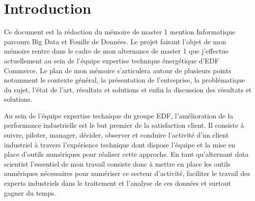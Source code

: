 \chapter*{Introduction}

Ce document est la rédaction du mémoire  de master 1 mention Informatique parcours Big Data et Fouille de Données. Le projet faisant l’objet de mon mémoire rentre dans le cadre de mon alternance de master 1 que j’effectue actuellement au sein de l’équipe expertise technique énergétique d’EDF Commerce.
Le plan de mon mémoire s’articulera autour de plusieurs points notamment le contexte général, la présentation de l’entreprise, la problématique du sujet, l’état de l’art, résultats et solutions et enfin la discussion des résultats et solutions.

Au sein de l’équipe expertise technique du groupe EDF, l’amélioration de la performance industrielle est le but premier de la satisfaction client. Il consiste  à suivre, piloter, manager, décider, observer et conduire l’activité d’un client industriel à travers l’expérience technique dont dispose l’équipe et la mise en place d’outils numériques pour réaliser cette approche. En tant qu’alternant data scientist l’essentiel de mon travail consiste donc à mettre en place les outils numériques nécessaires pour numériser ce secteur d’activité, faciliter le travail des experts industriels dans le traitement et l’analyse de ces données et surtout gagner du temps.
